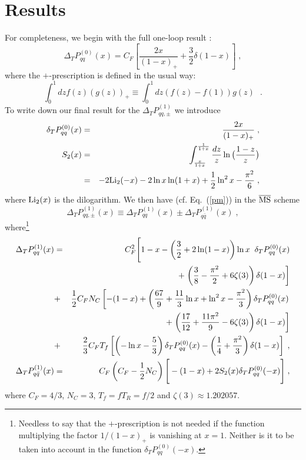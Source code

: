 \section{Results}
%
For completeness, we begin with the full one-loop result \cite{am}:
\begin{equation}
\Delta_T P_{qq}^{(0)} (x) = C_F \left[ \frac{2x}{(1-x)_+}+\frac{3}{2}
\delta (1-x) \right] \; ,
\end{equation}
where the $+$-prescription is defined in the usual way:
\begin{equation}
\int_0^1 dz f(z) \left( g(z) \right)_+ 
\equiv \int_0^1 dz \left( f(z)-f(1) \right) g(z) \:\:\: . 
\end{equation}
To write down our final result for the $\Delta_T P_{qq,\pm}^{(1)}$ we
introduce 
\begin{eqnarray} 
\delta_T P_{qq}^{(0)} (x) &=& \frac{2x}{(1-x)_+} \; , \\
S_2(x) &=& \int_{\frac{x}{1+x}}^{\frac{1}{1+x}} \frac{dz}{z} 
\ln \big(\frac{1-z}{z}\big) \nonumber \\
&=& -2 {\rm Li}_2 (-x)-2 \ln x \ln (1+x)+\frac{1}{2} \ln^2 x-
\frac{\pi^2}{6} \; ,
\end{eqnarray}
where ${\rm Li}_2 (x)$ is the dilogarithm. We then have (cf. Eq.~(\ref{pm})) 
in the $\overline{{\mbox{\rm MS}}}$ scheme
\begin{equation}
\Delta_T P_{qq,\pm}^{(1)} (x) \equiv \Delta_T P_{qq}^{(1)} (x) \pm 
\Delta_T P_{q\bar{q}}^{(1)} (x) \; ,
\end{equation}
where\footnote{Needless to say that the $+$-prescription is not 
needed if the function multiplying the factor $1/(1-x)_+$ is vanishing 
at $x=1$. Neither is it to be taken into account in the function 
$\delta_T P_{qq}^{(0)}(-x)$.}
\begin{eqnarray} 
\Delta_T P_{qq}^{(1)} (x) &=& C_F^2 \Bigg[ 1-x - \left( \frac{3}{2} + 
2 \ln (1-x) \right) \ln x \; \; \delta_T P_{qq}^{(0)}(x) \nonumber \\
&&\hspace*{1cm} + \left. \left( \frac{3}{8} -\frac{\pi^2}{2} + 6\zeta (3) 
\right) \delta (1-x) \right] \nonumber \\
&+& \frac{1}{2} C_F N_C \left[ - (1-x) + \left( \frac{67}{9} + \frac{11}{3} 
\ln x + \ln^2 x - \frac{\pi^2}{3} \right) \delta_T P_{qq}^{(0)}(x) \right. 
\nonumber \\
&& \hspace*{1.6cm} + \left. \left( \frac{17}{12} + \frac{11 \pi^2}{9} -
6 \zeta (3) \right) \delta (1-x) \right] \nonumber \\
&+&\frac{2}{3} C_F T_f  \left[ \left( - \ln x -\frac{5}{3} \right) \delta_T 
P_{qq}^{(0)}(x) - \left( \frac{1}{4} + \frac{\pi^2}{3} \right) \delta 
(1-x) \right] \; , \label{ppp} \\
\Delta_T P_{q\bar{q}}^{(1)} (x) &=& C_F \left( C_F - \frac{1}{2} N_C \right)
\Bigg[ -(1 -x) + 2 S_2 (x) \delta_T P_{qq}^{(0)}(-x) \Bigg] \; , \label{ppm}
\end{eqnarray}
where $C_F=4/3$, $N_C=3$, $T_f=f T_R=f/2$ and $\zeta (3) \approx 
1.202057$. 

